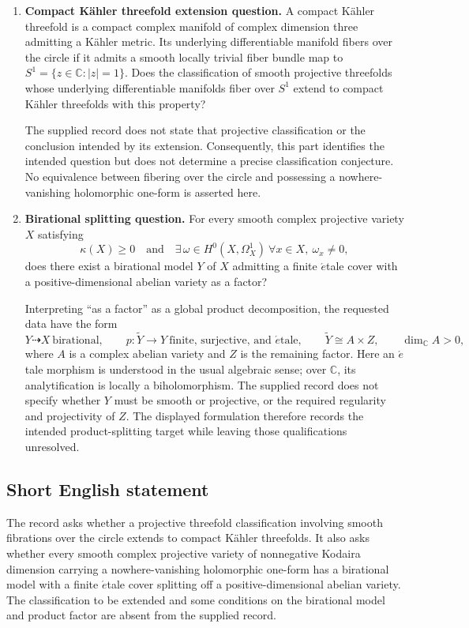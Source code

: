 \documentclass[11pt]{article}
\newcommand{\C}{\mathbb{C}}
\begin{document}
\begin{enumerate}
\item \textbf{Compact K\"ahler threefold extension question.} A compact K\"ahler threefold is a compact complex manifold of complex dimension three admitting a K\"ahler metric. Its underlying differentiable manifold fibers over the circle if it admits a smooth locally trivial fiber bundle map to \(S^1=\{z\in\C:|z|=1\}\). Does the classification of smooth projective threefolds whose underlying differentiable manifolds fiber over \(S^1\) extend to compact K\"ahler threefolds with this property?

The supplied record does not state that projective classification or the conclusion intended by its extension. Consequently, this part identifies the intended question but does not determine a precise classification conjecture. No equivalence between fibering over the circle and possessing a nowhere-vanishing holomorphic one-form is asserted here.

\item \textbf{Birational splitting question.} For every smooth complex projective variety \(X\) satisfying
\[
\kappa(X)\ge 0
\quad\text{and}\quad
\exists\,\omega\in H^0(X,\Omega_X^1)\ \forall x\in X,\ \omega_x\ne 0,
\]
does there exist a birational model \(Y\) of \(X\) admitting a finite \(\acute{e}\)tale cover with a positive-dimensional abelian variety as a factor?

Interpreting ``as a factor'' as a global product decomposition, the requested data have the form
\[
Y\dashrightarrow X\ \text{birational},\qquad
p:\widetilde Y\longrightarrow Y\ \text{finite, surjective, and \(\acute{e}\)tale},
\qquad
\widetilde Y\cong A\times Z,
\qquad \dim_{\C}A>0,
\]
where \(A\) is a complex abelian variety and \(Z\) is the remaining factor. Here an \(\acute{e}\)tale morphism is understood in the usual algebraic sense; over \(\C\), its analytification is locally a biholomorphism. The supplied record does not specify whether \(Y\) must be smooth or projective, or the required regularity and projectivity of \(Z\). The displayed formulation therefore records the intended product-splitting target while leaving those qualifications unresolved.
\end{enumerate}
\subsection{Short English statement}
The record asks whether a projective threefold classification involving smooth fibrations over the circle extends to compact K\"ahler threefolds. It also asks whether every smooth complex projective variety of nonnegative Kodaira dimension carrying a nowhere-vanishing holomorphic one-form has a birational model with a finite \(\acute{e}\)tale cover splitting off a positive-dimensional abelian variety. The classification to be extended and some conditions on the birational model and product factor are absent from the supplied record.
\end{document}
